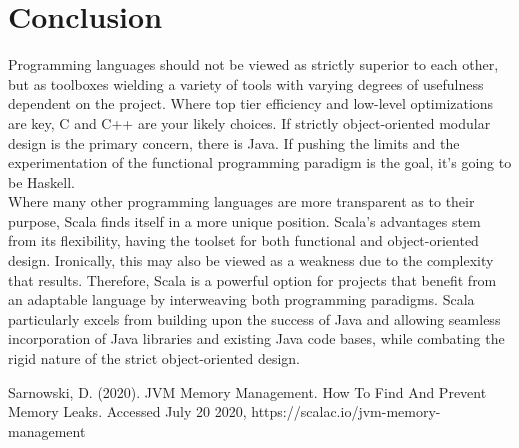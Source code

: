 \documentclass[12pt]{report}
\begin{document}
\section*{Conclusion}

Programming languages should not be viewed as strictly superior to each other, but as toolboxes wielding a variety of tools with varying degrees of usefulness dependent on the project. Where top tier efficiency and low-level optimizations are key, C and C++ are your likely choices. If strictly object-oriented modular design is the primary concern, there is Java. If pushing the limits and the experimentation of the functional programming paradigm is the goal, it’s going to be Haskell. \\
Where many other programming languages are more transparent as to their purpose, Scala finds itself in a more unique position. Scala’s advantages stem from its flexibility, having the toolset for both functional and object-oriented design. Ironically, this may also be viewed as a weakness due to the complexity that results. Therefore, Scala is a powerful option for projects that benefit from an adaptable language by interweaving both programming paradigms. Scala particularly excels from building upon the success of Java and allowing seamless incorporation of Java libraries and existing Java code bases, while combating the rigid nature of the strict object-oriented design.  \\

\begin{thebibliography}{}
\bibitem{} Sarnowski, D. (2020). JVM Memory Management. How To Find And Prevent Memory Leaks. Accessed July 20 2020, https://scalac.io/jvm-memory-management 
\end{thebibliography}
\end{document}
